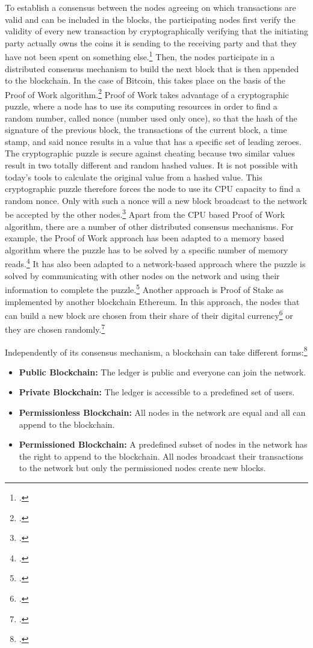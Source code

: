 To establish a consensus between the nodes agreeing on which transactions are valid and can be included in the blocks, the participating nodes first verify the validity of every new transaction by cryptographically verifying that the initiating party actually owns the coins it is sending to the receiving party and that they have not been spent on something else.\footcite[cf.][p.68]{AntonopolousAndreasM..2017} Then, the nodes participate in a distributed consensus mechanism to build the next block that is then appended to the blockchain. In the case of Bitcoin, this takes place on the basis of the Proof of Work algorithm.\footcites[Cf.][]{Dwork.1993}[cf.][p.3]{Nakamoto.2008} Proof of Work takes advantage of a cryptographic puzzle, where a node has to use its computing resources in order to find a random number, called nonce (number used only once), so that the hash of the signature of the previous block, the transactions of the current block, a time stamp, and said nonce results in a value that has a specific set of leading zeroes. The cryptographic puzzle is secure against cheating because two similar values result in two totally different and random hashed values. It is not possible with today's tools to calculate the original value from a hashed value. This cryptographic puzzle therefore forces the node to use its CPU capacity to find a random nonce. Only with such a nonce will a new block broadcast to the network be accepted by the other nodes.\footcites[Cf.][p.8]{Nakamoto.2008}[cf.][p.12]{Schutte.2017} Apart from the CPU based Proof of Work algorithm, there are a number of other distributed consensus mechanisms. For example, the Proof of Work approach has been adapted to a memory based algorithm where the puzzle has to be solved by a specific number of memory reads.\footcite[Cf.][]{Abadi.2005} It has also been adapted to a network-based approach where the puzzle is solved by communicating with other nodes on the network and using their information to complete the puzzle.\footcite[Cf.][]{Abliz.2009} Another approach is Proof of Stake as implemented by another blockchain Ethereum. In this approach, the nodes that can build a new block are chosen from their share of their digital currency\footcite[Cf.][]{King.2012} or they are chosen randomly.\footcites[Cf.][]{w.A..2016}[cf.][p.200]{AntonopolousAndreasM..2017}[cf.][p.11-12]{Schlatt.2016}

Independently of its consensus mechanism, a blockchain can take different forms:\footcite[Cf.][p.10-12]{Schlatt.2016}
\begin{itemize}
  \item \textbf{Public Blockchain:} The ledger is public and everyone can join the network.
  \item \textbf{Private Blockchain:} The ledger is accessible to a predefined set of users.
  \item \textbf{Permissionless Blockchain:} All nodes in the network are equal and all can append to the blockchain.
 \item \textbf{Permissioned Blockchain:} A predefined subset of nodes in the network has the right to append to the blockchain. All nodes broadcast their transactions to the network but only the permissioned nodes create new blocks.
\end{itemize} 

